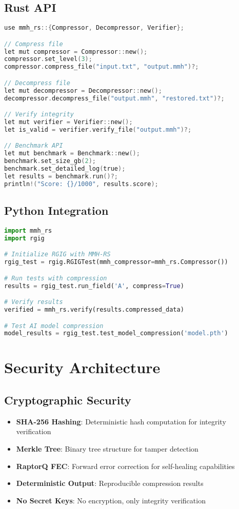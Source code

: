 \documentclass[12pt,a4paper]{article}
\begin{document}
\subsection{Rust API}
\begin{lstlisting}[language=C, caption=MMH-RS Rust API]
use mmh_rs::{Compressor, Decompressor, Verifier};

// Compress file
let mut compressor = Compressor::new();
compressor.set_level(3);
compressor.compress_file("input.txt", "output.mmh")?;

// Decompress file
let mut decompressor = Decompressor::new();
decompressor.decompress_file("output.mmh", "restored.txt")?;

// Verify integrity
let mut verifier = Verifier::new();
let is_valid = verifier.verify_file("output.mmh")?;

// Benchmark API
let mut benchmark = Benchmark::new();
benchmark.set_size_gb(2);
benchmark.set_detailed_log(true);
let results = benchmark.run()?;
println!("Score: {}/1000", results.score);
\end{lstlisting}

\subsection{Python Integration}
\begin{lstlisting}[language=Python, caption=MMH-RS Python Integration]
import mmh_rs
import rgig

# Initialize RGIG with MMH-RS
rgig_test = rgig.RGIGTest(mmh_compressor=mmh_rs.Compressor())

# Run tests with compression
results = rgig_test.run_field('A', compress=True)

# Verify results
verified = mmh_rs.verify(results.compressed_data)

# Test AI model compression
model_results = rgig_test.test_model_compression('model.pth')
\end{lstlisting}

\newpage

\section{Security Architecture}

\subsection{Cryptographic Security}
\begin{itemize}
    \item \textbf{SHA-256 Hashing}: Deterministic hash computation for integrity verification
    \item \textbf{Merkle Tree}: Binary tree structure for tamper detection
    \item \textbf{RaptorQ FEC}: Forward error correction for self-healing capabilities
    \item \textbf{Deterministic Output}: Reproducible compression results
    \item \textbf{No Secret Keys}: No encryption, only integrity verification
\end{itemize}
\end{document}
